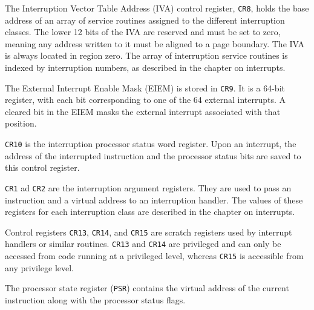 
The Interruption Vector Table Address (IVA) control register, \texttt{CR8}, holds the base address of an array of service routines assigned to the different interruption classes. The lower 12 bits of the IVA are reserved and must be set to zero, meaning any address written to it must be aligned to a page boundary. The IVA is always located in  region zero. The array of interruption service routines is indexed by interruption numbers, as described in the chapter on interrupts.


The External Interrupt Enable Mask (EIEM) is stored in \texttt{CR9}. It is a 64-bit register, with each bit corresponding to one of the 64 external interrupts. A cleared bit in the EIEM masks the external interrupt associated with that position.


\texttt{CR10} is the interruption processor status word register. Upon an interrupt, the address of the interrupted instruction and the processor status bits are saved to this control register.


\texttt{CR1} ad \texttt{CR2} are the interruption argument registers. They are used to pass an instruction and a virtual address to an interruption handler. The values of these registers for each interruption class are described in the chapter on interrupts.


Control registers \texttt{CR13}, \texttt{CR14}, and \texttt{CR15} are scratch registers used by interrupt handlers or similar routines. \texttt{CR13} and \texttt{CR14} are privileged and can only be accessed from code running at a privileged level, whereas \texttt{CR15} is accessible from any privilege level. 


The processor state register (\texttt{PSR}) contains the virtual address of the current instruction along with the processor status flags.

